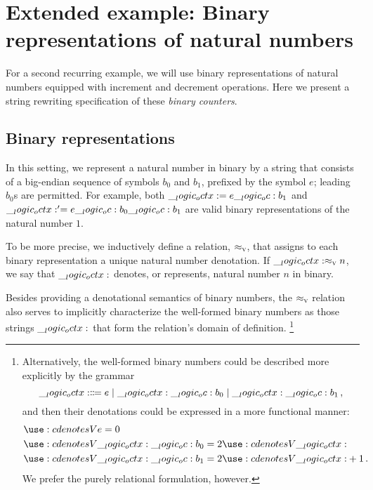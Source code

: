 \section{Extended example: Binary representations of natural numbers}\label{sec:string-rewriting:binary-counter}

For a second recurring example, we will use
binary representations of natural numbers equipped with increment and decrement operations. %
Here we present a string rewriting specification of these \emph{binary counters}.

\subsection{Binary representations}

In this setting, we represent a natural number in binary by a string that consists of a big-endian sequence of symbols $b_0$ and $b_1$, prefixed by the symbol $e$; leading $b_0$s are permitted.
For example, both $\__logic_octx: = e \__logic_oc: b_1$ and $\__logic_octx:' = e \__logic_oc: b_0 \__logic_oc: b_1$ are valid binary representations of the natural number $1$.%

To be more precise, we inductively define a relation, $ \approx\sb{\text{\normalfont\scshape v}} $, that assigns to each binary representation a unique natural number denotation.
If $\__logic_octx: \approx\sb{\text{\normalfont\scshape v}} n$, we say that $\__logic_octx:$ denotes, or represents, natural number $n$ in binary.
Besides providing a denotational semantics of binary numbers, the $ \approx\sb{\text{\normalfont\scshape v}} $ relation also serves to implicitly characterize the well-formed binary numbers as those strings $\__logic_octx:$ that form the relation's domain of definition.%
\footnote{Alternatively, the well-formed binary numbers could be described more explicitly by the grammar
\begin{equation*}
  \__logic_octx: \Coloneqq e \mid \__logic_octx: \__logic_oc: b_0 \mid \__logic_octx: \__logic_oc: b_1
  \,,
\end{equation*}
and then their denotations could be expressed in a more functional manner:
\begin{equation*}
  \begin{lgathered}
    \deno[V]{e} = 0 \\
    \deno[V]{\octx \oc b_0} = 2 \deno[V]{\octx} \\
    \deno[V]{\octx \oc b_1} = 2 \deno[V]{\octx} + 1
    \,.
  \end{lgathered}
\end{equation*}
We prefer the purely relational formulation, however.%
}


